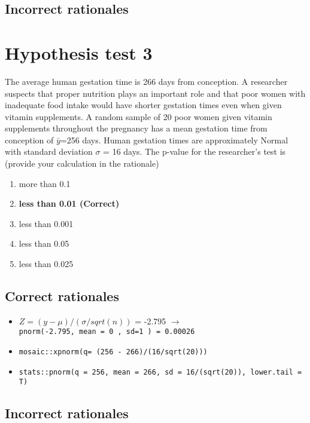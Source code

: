 \documentclass[letterpaper,9pt,twoside,printwatermark=false]{pinp}
\providecommand{\tightlist}{%
  \setlength{\itemsep}{0pt}\setlength{\parskip}{0pt}}
\begin{document}
\subsection{Incorrect rationales}\label{incorrect-rationales-1}

\section{Hypothesis test 3}\label{hypothesis-test-3}

The average human gestation time is 266 days from conception. A
researcher suspects that proper nutrition plays an important role and
that poor women with inadequate food intake would have shorter gestation
times even when given vitamin supplements. A random sample of 20 poor
women given vitamin supplements throughout the pregnancy has a mean
gestation time from conception of \(\bar{y}\)=256 days. Human gestation
times are approximately Normal with standard deviation \(\sigma\) = 16
days. The p-value for the researcher's test is (provide your calculation
in the rationale)

\begin{enumerate}
\def\labelenumi{\alph{enumi}.}
\tightlist
\item
  more than 0.1
\item
  \textbf{less than 0.01 (Correct)}
\item
  less than 0.001
\item
  less than 0.05
\item
  less than 0.025
\end{enumerate}

\subsection{Correct rationales}\label{correct-rationales-2}

\begin{itemize}
\tightlist
\item
  \(Z= (y - \mu)/ (\sigma / sqrt (n))\) = -2.795 \(\to\)
  \texttt{pnorm(-2.795,\ mean\ =\ 0\ ,\ sd=1\ )\ =\ 0.00026}
\item
  \texttt{mosaic::xpnorm(q=\ (256\ -\ 266)/(16/sqrt(20)))}
\item
  \texttt{stats::pnorm(q\ =\ 256,\ mean\ =\ 266,\ sd\ =\ 16/(sqrt(20)),\ lower.tail\ =\ T)}
\end{itemize}

\subsection{Incorrect rationales}\label{incorrect-rationales-2}
\end{document}
